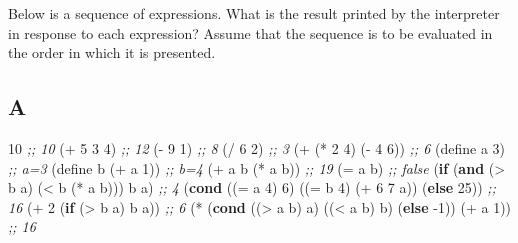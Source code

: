 \documentclass[
]{article}
\newenvironment{Shaded}{}{}
\newcommand{\CommentTok}[1]{\textcolor[rgb]{0.38,0.63,0.69}{\textit{#1}}}
\newcommand{\DecValTok}[1]{\textcolor[rgb]{0.25,0.63,0.44}{#1}}
\newcommand{\ExtensionTok}[1]{#1}
\newcommand{\FunctionTok}[1]{\textcolor[rgb]{0.02,0.16,0.49}{#1}}
\newcommand{\KeywordTok}[1]{\textcolor[rgb]{0.00,0.44,0.13}{\textbf{#1}}}
\newcommand{\NormalTok}[1]{#1}
\newcommand{\OperatorTok}[1]{\textcolor[rgb]{0.40,0.40,0.40}{#1}}
\begin{document}
Below is a sequence of expressions. What is the result printed by the
interpreter in response to each expression? Assume that the sequence is
to be evaluated in the order in which it is presented.

\hypertarget{a}{%
\subsection{A}\label{a}}

\begin{Shaded}
\begin{Highlighting}[numbers=left,,]
\DecValTok{10} \CommentTok{;; 10}
\NormalTok{(}\OperatorTok{+} \DecValTok{5} \DecValTok{3} \DecValTok{4}\NormalTok{) }\CommentTok{;; 12}
\NormalTok{(}\OperatorTok{{-}} \DecValTok{9} \DecValTok{1}\NormalTok{) }\CommentTok{;; 8}
\NormalTok{(}\OperatorTok{/} \DecValTok{6} \DecValTok{2}\NormalTok{) }\CommentTok{;; 3}
\NormalTok{(}\OperatorTok{+}\NormalTok{ (}\OperatorTok{*} \DecValTok{2} \DecValTok{4}\NormalTok{) (}\OperatorTok{{-}} \DecValTok{4} \DecValTok{6}\NormalTok{)) }\CommentTok{;; 6}
\NormalTok{(}\ExtensionTok{define}\FunctionTok{ a }\DecValTok{3}\NormalTok{) }\CommentTok{;; a=3}
\NormalTok{(}\ExtensionTok{define}\FunctionTok{ b }\NormalTok{(}\OperatorTok{+}\NormalTok{ a }\DecValTok{1}\NormalTok{)) }\CommentTok{;; b=4}
\NormalTok{(}\OperatorTok{+}\NormalTok{ a b (}\OperatorTok{*}\NormalTok{ a b)) }\CommentTok{;; 19}
\NormalTok{(}\OperatorTok{=}\NormalTok{ a b) }\CommentTok{;; false}
\NormalTok{(}\KeywordTok{if}\NormalTok{ (}\KeywordTok{and}\NormalTok{ (}\OperatorTok{\textgreater{}}\NormalTok{ b a) (}\OperatorTok{\textless{}}\NormalTok{ b (}\OperatorTok{*}\NormalTok{ a b)))}
\NormalTok{    b}
\NormalTok{    a) }\CommentTok{;; 4}
\NormalTok{(}\KeywordTok{cond}\NormalTok{ ((}\OperatorTok{=}\NormalTok{ a }\DecValTok{4}\NormalTok{) }\DecValTok{6}\NormalTok{)}
\NormalTok{      ((}\OperatorTok{=}\NormalTok{ b }\DecValTok{4}\NormalTok{) (}\OperatorTok{+} \DecValTok{6} \DecValTok{7}\NormalTok{ a))}
\NormalTok{      (}\KeywordTok{else} \DecValTok{25}\NormalTok{)) }\CommentTok{;; 16}
\NormalTok{(}\OperatorTok{+} \DecValTok{2}\NormalTok{ (}\KeywordTok{if}\NormalTok{ (}\OperatorTok{\textgreater{}}\NormalTok{ b a) b a)) }\CommentTok{;; 6}
\NormalTok{(}\OperatorTok{*}\NormalTok{ (}\KeywordTok{cond}\NormalTok{ ((}\OperatorTok{\textgreater{}}\NormalTok{ a b) a)}
\NormalTok{         ((}\OperatorTok{\textless{}}\NormalTok{ a b) b)}
\NormalTok{         (}\KeywordTok{else}\NormalTok{ {-}}\DecValTok{1}\NormalTok{))}
\NormalTok{   (}\OperatorTok{+}\NormalTok{ a }\DecValTok{1}\NormalTok{)) }\CommentTok{;; 16}
\end{Highlighting}
\end{Shaded}
\end{document}

